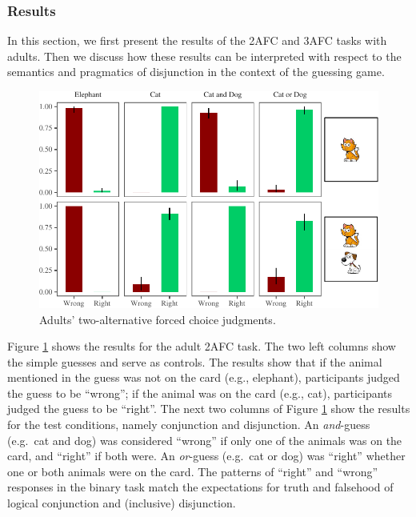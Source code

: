 \documentclass[floatsintext,man]{apa6}
\theoremstyle{definition}
\theoremstyle{definition}
\theoremstyle{definition}
\theoremstyle{remark}
\begin{document}
\subsubsection{Results}\label{results}

In this section, we first present the results of the 2AFC and 3AFC tasks
with adults. Then we discuss how these results can be interpreted with
respect to the semantics and pragmatics of disjunction in the context of
the guessing game.

\begin{figure}
\centering
\includegraphics{figs/binaryAdultsPlot-1.pdf}
\caption{\label{fig:binaryAdultsPlot}Adults' two-alternative forced choice
judgments.}
\end{figure}

Figure \ref{fig:binaryAdultsPlot} shows the results for the adult 2AFC
task. The two left columns show the simple guesses and serve as
controls. The results show that if the animal mentioned in the guess was
not on the card (e.g., elephant), participants judged the guess to be
\enquote{wrong}; if the animal was on the card (e.g., cat), participants
judged the guess to be \enquote{right}. The next two columns of Figure
\ref{fig:binaryAdultsPlot} show the results for the test conditions,
namely conjunction and disjunction. An \emph{and}-guess (e.g.~cat and
dog) was considered \enquote{wrong} if only one of the animals was on
the card, and \enquote{right} if both were. An \emph{or}-guess (e.g.~cat
or dog) was \enquote{right} whether one or both animals were on the
card. The patterns of \enquote{right} and \enquote{wrong} responses in
the binary task match the expectations for truth and falsehood of
logical conjunction and (inclusive) disjunction.
\end{document}
